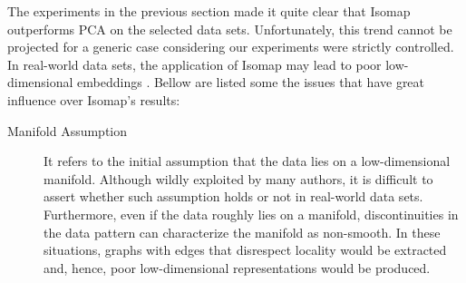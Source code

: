 \documentclass[12pt]{article}
\begin{document}
The experiments in the previous section made it quite clear that Isomap outperforms PCA on the selected data sets. Unfortunately, this trend cannot be projected for a generic case considering our experiments were strictly controlled. In real-world data sets, the application of Isomap may lead to poor low-dimensional embeddings \cite{herik2009}. Bellow are listed some the issues that have great influence over Isomap's results:
\begin{description}
	\item[Manifold Assumption] It refers to the initial assumption that the data lies on a low-dimensional manifold. Although wildly exploited by many authors, it is difficult to assert whether such assumption holds or not in real-world data sets. \cite{lin2008riemannian} Furthermore, even if the data roughly lies on a manifold, discontinuities in the data pattern can characterize the manifold as non-smooth. In these situations, graphs with edges that disrespect locality would be extracted and, hence, poor low-dimensional representations would be produced.


\end{description}
\end{document}
